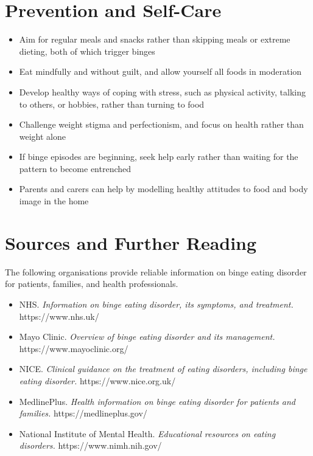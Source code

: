 \section*{Prevention and Self-Care}
\begin{itemize}
    \item Aim for regular meals and snacks rather than skipping meals or extreme dieting, both of which trigger binges
    \item Eat mindfully and without guilt, and allow yourself all foods in moderation
    \item Develop healthy ways of coping with stress, such as physical activity, talking to others, or hobbies, rather than turning to food
    \item Challenge weight stigma and perfectionism, and focus on health rather than weight alone
    \item If binge episodes are beginning, seek help early rather than waiting for the pattern to become entrenched
    \item Parents and carers can help by modelling healthy attitudes to food and body image in the home
\end{itemize}

\section*{Sources and Further Reading}
The following organisations provide reliable information on binge eating disorder for patients, families, and health professionals.

\begin{itemize}
    \item NHS. \textit{Information on binge eating disorder, its symptoms, and treatment.} https://www.nhs.uk/
    \item Mayo Clinic. \textit{Overview of binge eating disorder and its management.} https://www.mayoclinic.org/
    \item NICE. \textit{Clinical guidance on the treatment of eating disorders, including binge eating disorder.} https://www.nice.org.uk/
    \item MedlinePlus. \textit{Health information on binge eating disorder for patients and families.} https://medlineplus.gov/
    \item National Institute of Mental Health. \textit{Educational resources on eating disorders.} https://www.nimh.nih.gov/
\end{itemize}
